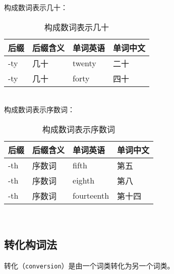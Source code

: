 \documentclass[UTF8]{ctexart}
\begin{document}
    构成数词表示几十：\vspace{5pt}
    \begin{table}[h!]
        \begin{center}
            \ttfamily
            \begin{tabular}{p{40pt}|p{80pt}|p{80pt}|p{80pt}}
                \hline
                后缀&后缀含义&单词英语&单词中文\\ \hline
                -ty&几十&twenty&二十\\ \hline
                -ty&几十&forty&四十\\ \hline
            \end{tabular}
            \rmfamily
            \caption{构成数词表示几十}
        \end{center}
    \end{table}\\
    构成数词表示序数词：\vspace{5pt}
    \begin{table}[h!]
        \begin{center}
            \ttfamily
            \begin{tabular}{p{40pt}|p{80pt}|p{80pt}|p{80pt}}
                \hline
                后缀&后缀含义&单词英语&单词中文\\ \hline
                -th&序数词&fifth&第五\\ \hline
                -th&序数词&eighth&第八\\ \hline
                -th&序数词&fourteenth&第十四\\ \hline
            \end{tabular}
            \rmfamily
            \caption{构成数词表示序数词}
        \end{center}
    \end{table}\\

\newpage

\subsection{转化构词法}
    转化（\texttt{conversion}）是由一个词类转化为另一个词类。
\end{document}
